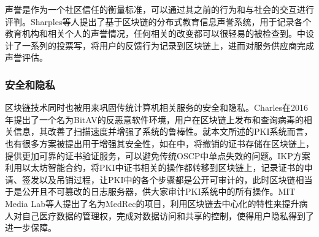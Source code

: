 声誉是作为一个社区信任的衡量标准，可以通过其之前的行为和与社会的交互进行评判。Sharples等人提出了基于区块链的分布式教育信息声誉系统\supercite{sharples2016blockchain}，用于记录各个教育机构和相关个人的声誉情况，任何相关的改变都可以很轻易的被检查到。\parencite{carboni2015feedback}中设计了一系列的投票写，将用户的反馈行为记录到区块链上，进而对服务供应商完成声誉评估。


\subsubsection{安全和隐私}

区块链技术同时也被用来巩固传统计算机相关服务的安全和隐私。Charles在2016年提出了一个名为BitAV的反恶意软件环境，用户在区块链上发布和查询病毒的相关信息，其改善了扫描速度并增强了系统的鲁棒性。就本文所述的PKI系统而言，也有很多方案被提出用于增强其安全性，如在\parencite{baldi2017certificate}中，将撤销的证书存储在区块链上，提供更加可靠的证书验证服务，可以避免传统OSCP中单点失效的问题。IKP\supercite{matsumoto2016ikp}方案利用以太坊智能合约，将PKI中证书相关的操作都转移到区块链上，记录证书的申请、签发以及吊销过程，让PKI中的各个步骤都是公开可审计的，此时区块链相当于是公开且不可篡改的日志服务器，供大家审计PKI系统中的所有操作。MIT Media Lab等人提出了名为MedRec\supercite{azaria2016medrec}的项目，利用区块链去中心化的特性来提升病人对自己医疗数据的管理权，完成对数据访问和共享的控制，使得用户隐私得到了进一步保障。









